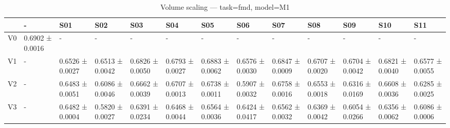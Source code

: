 \begin{table}[htbp]
\centering
\caption{Volume scaling — task=fmd, model=M1}
\label{tab:volume:fmd:M1}
\begin{tabular}{lllllllllllll}
\toprule
\toprule
 & - & S01 & S02 & S03 & S04 & S05 & S06 & S07 & S08 & S09 & S10 & S11 \\
\midrule
\midrule
V0 & 0.6902 ± 0.0016 & - & - & - & - & - & - & - & - & - & - & - \\
V1 & - & 0.6526 ± 0.0027 & 0.6513 ± 0.0042 & 0.6826 ± 0.0050 & 0.6793 ± 0.0027 & 0.6883 ± 0.0062 & 0.6576 ± 0.0030 & 0.6847 ± 0.0009 & 0.6707 ± 0.0020 & 0.6704 ± 0.0042 & 0.6821 ± 0.0040 & 0.6577 ± 0.0055 \\
V2 & - & 0.6483 ± 0.0051 & 0.6086 ± 0.0046 & 0.6662 ± 0.0039 & 0.6707 ± 0.0013 & 0.6738 ± 0.0011 & 0.5907 ± 0.0032 & 0.6758 ± 0.0016 & 0.6553 ± 0.0018 & 0.6316 ± 0.0169 & 0.6608 ± 0.0036 & 0.6285 ± 0.0025 \\
V3 & - & 0.6482 ± 0.0004 & 0.5820 ± 0.0027 & 0.6391 ± 0.0234 & 0.6468 ± 0.0044 & 0.6564 ± 0.0036 & 0.6424 ± 0.0417 & 0.6562 ± 0.0032 & 0.6369 ± 0.0042 & 0.6054 ± 0.0266 & 0.6356 ± 0.0062 & 0.6086 ± 0.0006 \\
\bottomrule
\end{tabular}\end{table}
